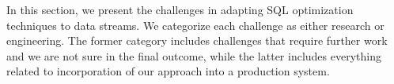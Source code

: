 \label {sec:fs-optimization-challenges}
In this section, we present the challenges in adapting SQL optimization techniques to data streams. We categorize each challenge as either research or engineering.  The former category includes challenges that require further work and we are not sure in the final outcome, while the latter includes everything related to incorporation of our approach into a production system. 
